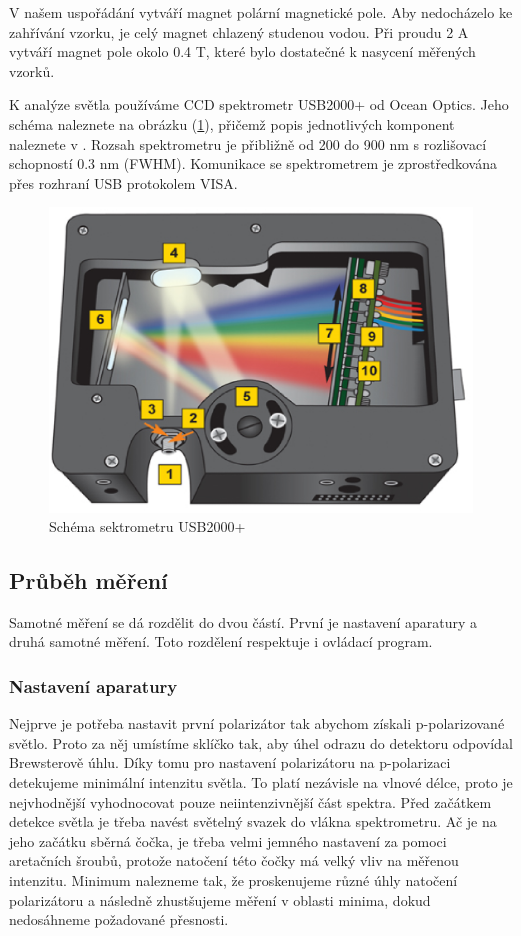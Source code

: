 V našem uspořádání vytváří magnet polární magnetické pole. Aby nedocházelo ke zahřívání vzorku, je celý magnet chlazený studenou vodou. Při proudu 2 A vytváří magnet pole okolo 0.4 T, které bylo dostatečné k nasycení měřených vzorků. %

K analýze světla používáme CCD spektrometr USB2000+ od Ocean Optics. Jeho schéma naleznete na obrázku (\ref{USB2000+ schema}), přičemž popis jednotlivých komponent naleznete v \cite{USB2000}. Rozsah spektrometru je přibližně od 200 do 900 nm s rozlišovací schopností 0.3 nm (FWHM). Komunikace se spektrometrem je zprostředkována přes rozhraní USB protokolem VISA. 

\begin{figure}
    \begin{center}
    \includegraphics[width=5in]{img/usb4openbench.eps}
    \end{center}
    \caption{Schéma sektrometru USB2000+ \cite{USB2000}}
    \label{USB2000+ schema}
\end{figure}

\subsection{Průběh měření}
Samotné měření se dá rozdělit do dvou částí. První je nastavení aparatury a druhá samotné měření. Toto rozdělení respektuje i ovládací program.
\subsubsection{Nastavení aparatury}
Nejprve je potřeba nastavit první polarizátor tak abychom získali p-polarizované světlo. 
Proto za něj umístíme sklíčko tak, aby úhel odrazu do detektoru odpovídal Brewsterově úhlu. 
Díky tomu pro nastavení polarizátoru na p-polarizaci detekujeme minimální intenzitu světla. 
To platí nezávisle na vlnové délce, proto je nejvhodnější vyhodnocovat pouze neiintenzivnější část spektra. 
Před začátkem detekce světla je třeba navést světelný svazek do vlákna spektrometru. Ač je na jeho začátku sběrná čočka, 
je třeba velmi jemného nastavení za pomoci aretačních šroubů, protože natočení této čočky má velký vliv na měřenou intenzitu.
Minimum nalezneme tak, že proskenujeme různé úhly natočení polarizátoru a následně zhustšujeme měření v oblasti minima, dokud nedosáhneme požadované přesnosti.

